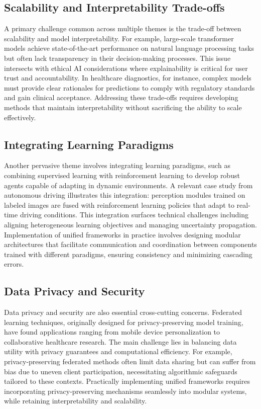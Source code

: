 \documentclass[sigconf]{acmart}
\begin{document}
\subsection{Scalability and Interpretability Trade-offs}

A primary challenge common across multiple themes is the trade-off between scalability and model interpretability. For example, large-scale transformer models achieve state-of-the-art performance on natural language processing tasks but often lack transparency in their decision-making processes. This issue intersects with ethical AI considerations where explainability is critical for user trust and accountability. In healthcare diagnostics, for instance, complex models must provide clear rationales for predictions to comply with regulatory standards and gain clinical acceptance. Addressing these trade-offs requires developing methods that maintain interpretability without sacrificing the ability to scale effectively.

\subsection{Integrating Learning Paradigms}

Another pervasive theme involves integrating learning paradigms, such as combining supervised learning with reinforcement learning to develop robust agents capable of adapting in dynamic environments. A relevant case study from autonomous driving illustrates this integration: perception modules trained on labeled images are fused with reinforcement learning policies that adapt to real-time driving conditions. This integration surfaces technical challenges including aligning heterogeneous learning objectives and managing uncertainty propagation. Implementation of unified frameworks in practice involves designing modular architectures that facilitate communication and coordination between components trained with different paradigms, ensuring consistency and minimizing cascading errors.

\subsection{Data Privacy and Security}

Data privacy and security are also essential cross-cutting concerns. Federated learning techniques, originally designed for privacy-preserving model training, have found applications ranging from mobile device personalization to collaborative healthcare research. The main challenge lies in balancing data utility with privacy guarantees and computational efficiency. For example, privacy-preserving federated methods often limit data sharing but can suffer from bias due to uneven client participation, necessitating algorithmic safeguards tailored to these contexts. Practically implementing unified frameworks requires incorporating privacy-preserving mechanisms seamlessly into modular systems, while retaining interpretability and scalability.
\end{document}
